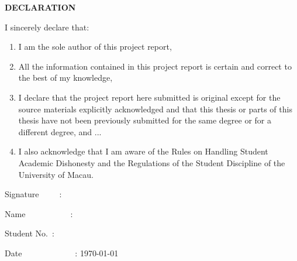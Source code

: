 \documentclass[12pt,,a4paper]{article}
\begin{document}
\clearpage


\onecolumn

\begin{center}
\textbf{\fontsize{20}{\baselineskip}\selectfont DECLARATION}

\bigskip

\end{center}
I sincerely declare that:
\begin{enumerate}
      \item I am the sole author of this project report,
      \item All the information contained in this project report is certain and correct to the best of my knowledge,
      \item I declare that the project report here submitted is original except for the source materials explicitly acknowledged and that this thesis or parts of this thesis have not been previously submitted for the same degree or for a different degree, and ...
      \item I also acknowledge that I am aware of the Rules on Handling Student Academic Dishonesty and the Regulations of the Student Discipline of the University of Macau.
\end{enumerate}

\bigskip

\bigskip

Signature\ \ \ \ \ :

\bigskip

\bigskip

Name\ \ \ \ \ \ \ \ \ \ \ :

\bigskip

\bigskip

Student No.\ :

\bigskip

\bigskip

Date\ \ \ \ \ \ \ \ \ \ \ \ \ : {\today}
\clearpage
\end{document}
